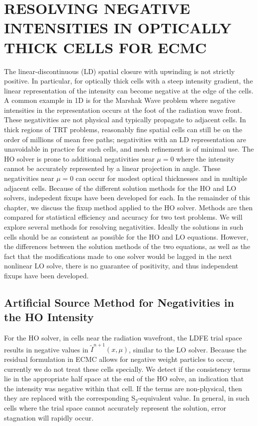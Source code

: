 

\chapter{\uppercase{Resolving Negative Intensities in Optically Thick Cells for
ECMC}}
\label{chp:negativities}

The linear-discontinuous (LD) spatial closure with upwinding is not
strictly positive.  In particular, for optically thick cells with a steep intensity
gradient, the linear representation of the intensity can become negative at the edge of the cells.
A common example in 1D is for the Marshak Wave
problem where negative
intensities in the representation occurs at the foot of the radiation wave front. These negativities are not physical and typically propagate to
adjacent cells. In thick regions of
TRT problems, reasonably fine spatial cells can still be on the order of millions of mean
free paths; negativities with an LD representation are unavoidable in practice for
such cells, and mesh refinement is of minimal use.
The HO solver is prone to additional negativities near $\mu=0$ where the intensity
cannot be accurately represented by a linear projection in angle.  These negativities near
$\mu=0$ can occur for modest optical thicknesses and in multiple adjacent cells.
Because of the different solution methods for the HO and LO solvers, indepedent fixups
have been developed for each. 
In the remainder of this chapter, we discuss the fixup method applied to the HO
solver.  Methods are then compared for statistical efficiency and accuracy for two test problems.
      We will explore several methods
for resolving negativities.  Ideally the solutions in
such cells should be as consistent as possible for the HO and LO equations.  However,
the differences between the solution methods of the two equations, as well as the
fact that the modifications made to one solver would be lagged in the next nonlinear LO solve, there
is no guarantee of positivity, and thus independent fixups have been developed.  


\section{Artificial Source Method for Negativities in the HO Intensity}

For the HO solver, in cells near the radiation wavefront, the LDFE trial space results in
negative values in $\tilde{I}^{n+1}(x,\mu)$, similar to the LO solver.  Because the residual formulation in ECMC allows for negative weight
particles to occur, currently we do not treat these cells specially.  We detect if
the consistency terms lie in the appropriate half space at the end of the HO solve,
an indication that the intensity was negative within that cell.  If the terms are non-physical, then
they are replaced with the corresponding S$_2$-equivalent value. In general,
in such cells where the trial space cannot accurately represent the solution, error stagnation will
rapidly occur. 

